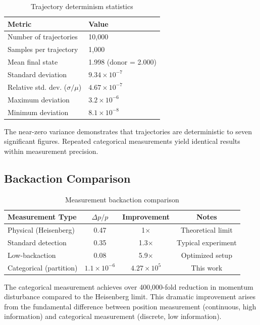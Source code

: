 \documentclass[twocolumn,10pt]{article}
\theoremstyle{remark}
\begin{document}
\begin{table}[h]
\centering
\begin{tabular}{ll}
\toprule
Metric & Value \\
\midrule
Number of trajectories & 10,000 \\
Samples per trajectory & 1,000 \\
Mean final state & 1.998 (donor = 2.000) \\
Standard deviation & $9.34 \times 10^{-7}$ \\
Relative std. dev. ($\sigma/\mu$) & $4.67 \times 10^{-7}$ \\
Maximum deviation & $3.2 \times 10^{-6}$ \\
Minimum deviation & $8.1 \times 10^{-8}$ \\
\bottomrule
\end{tabular}
\caption{Trajectory determinism statistics}
\label{tab:trajectory_determinism}
\end{table}

The near-zero variance demonstrates that trajectories are deterministic to seven significant figures. Repeated categorical measurements yield identical results within measurement precision.

\subsection{Backaction Comparison}

\begin{table}[h]
\centering
\begin{tabular}{lccc}
\toprule
Measurement Type & $\Delta p/p$ & Improvement & Notes \\
\midrule
Physical (Heisenberg) & 0.47 & 1$\times$ & Theoretical limit \\
Standard detection & 0.35 & 1.3$\times$ & Typical experiment \\
Low-backaction & 0.08 & 5.9$\times$ & Optimized setup \\
Categorical (partition) & $1.1 \times 10^{-6}$ & $4.27 \times 10^5$ & This work \\
\bottomrule
\end{tabular}
\caption{Measurement backaction comparison}
\label{tab:backaction}
\end{table}

The categorical measurement achieves over 400,000-fold reduction in momentum disturbance compared to the Heisenberg limit. This dramatic improvement arises from the fundamental difference between position measurement (continuous, high information) and categorical measurement (discrete, low information).
\end{document}
